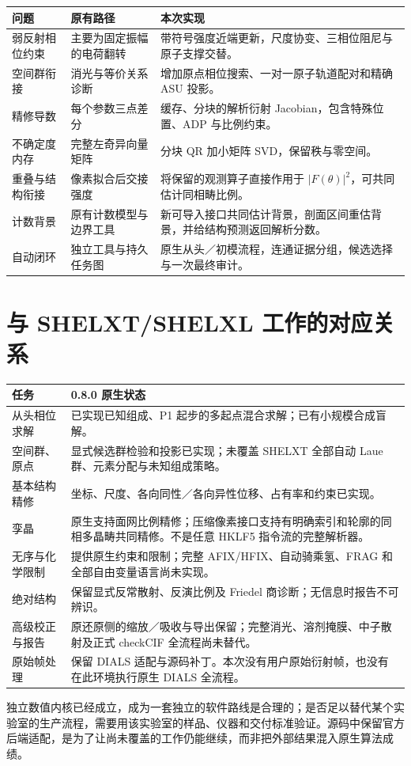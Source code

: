 \begin{longtable}{p{}p{}p{}}
\toprule 问题 & 原有路径 & 本次实现\\\midrule
弱反射相位约束 & 主要为固定振幅的电荷翻转 & 带符号强度近端更新，尺度协变、三相位阻尼与原子支撑交替。\\
空间群衔接 & 消光与等价关系诊断 & 增加原点相位搜索、一对一原子轨道配对和精确 ASU 投影。\\
精修导数 & 每个参数三点差分 & 缓存、分块的解析衍射 Jacobian，包含特殊位置、ADP 与比例约束。\\
不确定度内存 & 完整左奇异向量矩阵 & 分块 QR 加小矩阵 SVD，保留秩与零空间。\\
重叠与结构衔接 & 像素拟合后交接强度 & 将保留的观测算子直接作用于 $|F(\theta)|^2$，可共同估计同相畴比例。\\
计数背景 & 原有计数模型与边界工具 & 新可导入接口共同估计背景，剖面区间重估背景，并给结构预测返回解析分数。\\
自动闭环 & 独立工具与持久任务图 & 原生从头／初模流程，连通证据分组，候选选择与一次最终审计。\\
\bottomrule
\end{longtable}

\section{与 SHELXT/SHELXL 工作的对应关系}
\begin{longtable}{p{}p{}}
\toprule 任务 & 0.8.0 原生状态\\\midrule
从头相位求解 & 已实现已知组成、P1 起步的多起点混合求解；已有小规模合成盲解。\\
空间群、原点 & 显式候选群检验和投影已实现；未覆盖 SHELXT 全部自动 Laue 群、元素分配与未知组成策略。\\
基本结构精修 & 坐标、尺度、各向同性／各向异性位移、占有率和约束已实现。\\
孪晶 & 原生支持面网比例精修；压缩像素接口支持有明确索引和轮廓的同相多晶畴共同精修。不是任意 HKLF5 指令流的完整解析器。\\
无序与化学限制 & 提供原生约束和限制；完整 AFIX/HFIX、自动骑乘氢、FRAG 和全部自由变量语言尚未实现。\\
绝对结构 & 保留显式反常散射、反演比例及 Friedel 商诊断；无信息时报告不可辨识。\\
高级校正与报告 & 原还原侧的缩放／吸收与导出保留；完整消光、溶剂掩膜、中子散射及正式 checkCIF 全流程尚未替代。\\
原始帧处理 & 保留 DIALS 适配与源码补丁。本次没有用户原始衍射帧，也没有在此环境执行原生 DIALS 全流程。\\
\bottomrule
\end{longtable}

独立数值内核已经成立，成为一套独立的软件路线是合理的；是否足以替代某个实验室的生产流程，需要用该实验室的样品、仪器和交付标准验证。源码中保留官方后端适配，是为了让尚未覆盖的工作仍能继续，而非把外部结果混入原生算法成绩。
